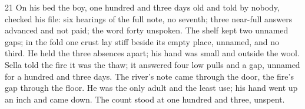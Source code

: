 \begin{CRchronicle}{21}
On his bed the boy, one hundred and three days old and told by nobody, checked his file: six hearings of the full note, no seventh; three near-full answers advanced and not paid; the word forty unspoken. The shelf kept two unnamed gaps; in the fold one crust lay stiff beside its empty place, unnamed, and no third. He held the three absences apart; his hand was small and outside the wool. Sella told the fire it was the thaw; it answered four low pulls and a gap, unnamed for a hundred and three days. The river’s note came through the door, the fire’s gap through the floor. He was the only adult and the least use; his hand went up an inch and came down. The count stood at one hundred and three, unspent.
\end{CRchronicle}

